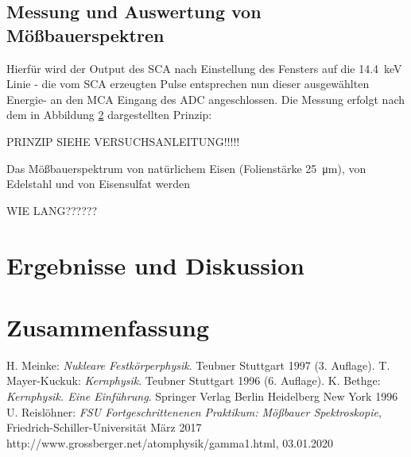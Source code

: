 \documentclass[a4paper,twoside,final]{article}
\begin{document}
\subsection{Messung und Auswertung von Mößbauerspektren}
Hierfür wird der Output des SCA nach Einstellung des Fensters auf die \SI{14,4}{\kilo\eV} Linie - die vom SCA erzeugten Pulse entsprechen nun dieser ausgewählten Energie-
an den MCA Eingang des ADC angeschlossen.
Die Messung erfolgt nach dem in Abbildung \ref{} dargestellten Prinzip:

PRINZIP SIEHE VERSUCHSANLEITUNG!!!!!

Das Mößbauerspektrum von natürlichem Eisen (Folienstärke \SI{25}{\micro\meter}), von Edelstahl und von Eisensulfat werden

WIE LANG??????



\newpage
\section{Ergebnisse und Diskussion}


\section{Zusammenfassung}

\begin{thebibliography}{xxx}
	H. Meinke: \textit{Nukleare Festkörperphysik}. Teubner Stuttgart 1997 (3. Auflage).
	T. Mayer-Kuckuk: \textit{Kernphysik}. Teubner Stuttgart 1996 (6. Auflage).
  K. Bethge: \textit{Kernphysik. Eine Einführung}. Springer Verlag Berlin Heidelberg New York 1996
  U. Reislöhner: \textit{FSU Fortgeschrittenenen Praktikum: Mößbauer Spektroskopie}, Fried\-rich-Schil\-ler-Uni\-versi\-tät März 2017
  http://www.grossberger.net/atomphysik/gamma1.html, 03.01.2020
\end{thebibliography}
\end{document}
